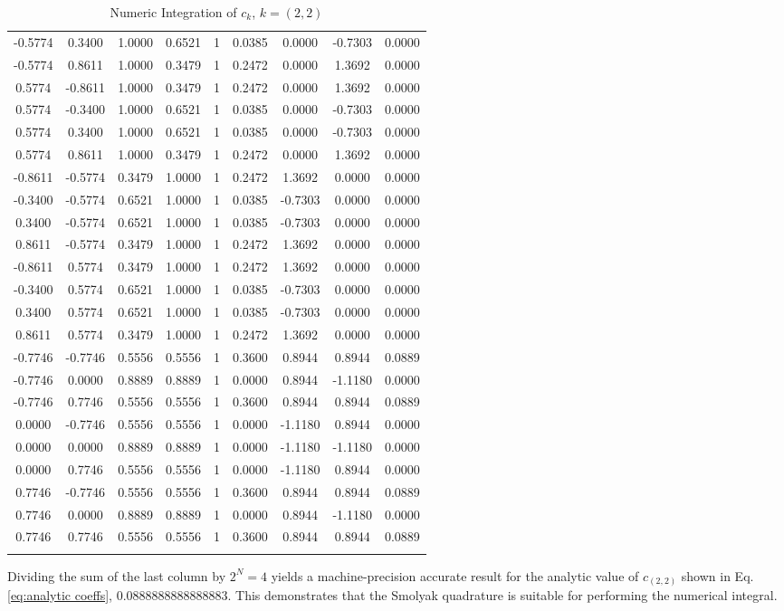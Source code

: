 \documentclass[11pt]{article}
\begin{document}
\begin{longtable}{c c|c c|c|c|c c|c}
-0.5774 & 0.3400 & 1.0000 & 0.6521 & 1 & 0.0385 & 0.0000 & -0.7303 & 0.0000 \\
-0.5774 & 0.8611 & 1.0000 & 0.3479 & 1 & 0.2472 & 0.0000 & 1.3692 & 0.0000 \\
0.5774 & -0.8611 & 1.0000 & 0.3479 & 1 & 0.2472 & 0.0000 & 1.3692 & 0.0000 \\
0.5774 & -0.3400 & 1.0000 & 0.6521 & 1 & 0.0385 & 0.0000 & -0.7303 & 0.0000 \\
0.5774 & 0.3400 & 1.0000 & 0.6521 & 1 & 0.0385 & 0.0000 & -0.7303 & 0.0000 \\
0.5774 & 0.8611 & 1.0000 & 0.3479 & 1 & 0.2472 & 0.0000 & 1.3692 & 0.0000 \\
-0.8611 & -0.5774 & 0.3479 & 1.0000 & 1 & 0.2472 & 1.3692 & 0.0000 & 0.0000 \\
-0.3400 & -0.5774 & 0.6521 & 1.0000 & 1 & 0.0385 & -0.7303 & 0.0000 & 0.0000 \\
0.3400 & -0.5774 & 0.6521 & 1.0000 & 1 & 0.0385 & -0.7303 & 0.0000 & 0.0000 \\
0.8611 & -0.5774 & 0.3479 & 1.0000 & 1 & 0.2472 & 1.3692 & 0.0000 & 0.0000 \\
-0.8611 & 0.5774 & 0.3479 & 1.0000 & 1 & 0.2472 & 1.3692 & 0.0000 & 0.0000 \\
-0.3400 & 0.5774 & 0.6521 & 1.0000 & 1 & 0.0385 & -0.7303 & 0.0000 & 0.0000 \\
0.3400 & 0.5774 & 0.6521 & 1.0000 & 1 & 0.0385 & -0.7303 & 0.0000 & 0.0000 \\
0.8611 & 0.5774 & 0.3479 & 1.0000 & 1 & 0.2472 & 1.3692 & 0.0000 & 0.0000 \\
-0.7746 & -0.7746 & 0.5556 & 0.5556 & 1 & 0.3600 & 0.8944 & 0.8944 & 0.0889 \\
-0.7746 & 0.0000 & 0.8889 & 0.8889 & 1 & 0.0000 & 0.8944 & -1.1180 & 0.0000 \\
-0.7746 & 0.7746 & 0.5556 & 0.5556 & 1 & 0.3600 & 0.8944 & 0.8944 & 0.0889 \\
0.0000 & -0.7746 & 0.5556 & 0.5556 & 1 & 0.0000 & -1.1180 & 0.8944 & 0.0000 \\
0.0000 & 0.0000 & 0.8889 & 0.8889 & 1 & 0.0000 & -1.1180 & -1.1180 & 0.0000 \\
0.0000 & 0.7746 & 0.5556 & 0.5556 & 1 & 0.0000 & -1.1180 & 0.8944 & 0.0000 \\
0.7746 & -0.7746 & 0.5556 & 0.5556 & 1 & 0.3600 & 0.8944 & 0.8944 & 0.0889 \\
0.7746 & 0.0000 & 0.8889 & 0.8889 & 1 & 0.0000 & 0.8944 & -1.1180 & 0.0000 \\
0.7746 & 0.7746 & 0.5556 & 0.5556 & 1 & 0.3600 & 0.8944 & 0.8944 & 0.0889 \\
\caption{Numeric Integration of $c_k$, $k=(2,2)$}
\label{tab:2 2}
\end{longtable}
Dividing the sum of the last column by $2^N=4$ yields a machine-precision accurate result for the analytic value
of $c_{(2,2)}$ shown in Eq. \ref{eq:analytic coeffs}, 0.0888888888888883.  This demonstrates that the Smolyak
quadrature is suitable for performing the numerical integral.
\end{document}
